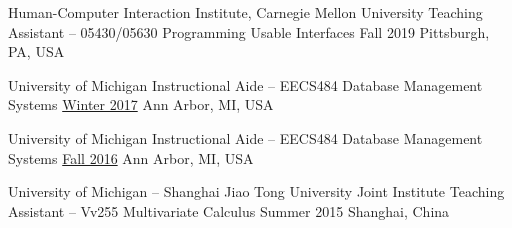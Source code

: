 
\begin{cvteachingexps}

  \cvteachingexp
    {Human-Computer Interaction Institute, Carnegie Mellon University} %
    {Teaching Assistant – 05430/05630 Programming Usable Interfaces} %
    {Fall 2019} %
    {Pittsburgh, PA, USA} %
    

  \cvteachingexp
    {University of Michigan} %
    {Instructional Aide – EECS484 Database Management Systems} %
    {\href{http://web.eecs.umich.edu/~mozafari/eecs484/}{Winter 2017}} %
    {Ann Arbor, MI, USA} %
  
  \cvteachingexp
    {University of Michigan} %
    {Instructional Aide – EECS484 Database Management Systems} %
    {\href{http://web.eecs.umich.edu/~aprakash/eecs484/index.html}{Fall 2016}} %
    {Ann Arbor, MI, USA} %

  \cvteachingexp
    {University of Michigan – Shanghai Jiao Tong University Joint Institute} %
    {Teaching Assistant – Vv255 Multivariate Calculus} %
    {Summer 2015} %
    {Shanghai, China} %

\end{cvteachingexps}